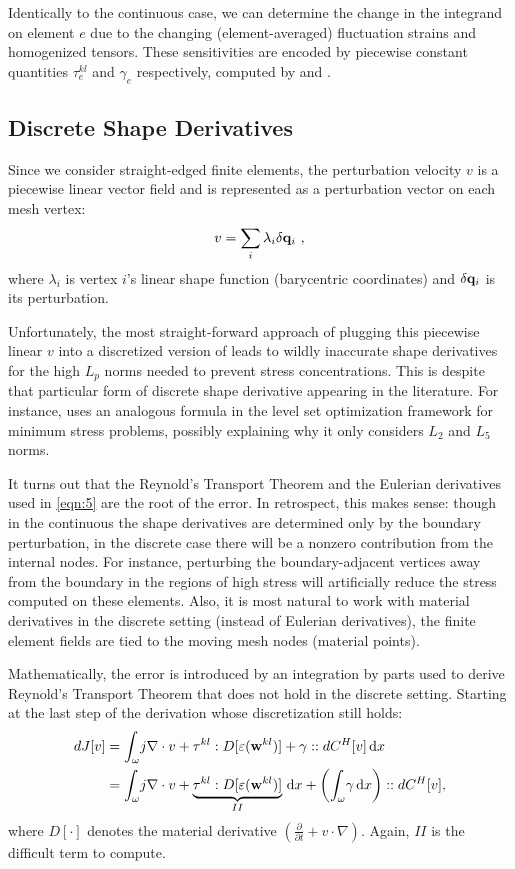 \documentclass[10pt]{article}
\renewcommand{\div}{\nabla \cdot}
\providecommand{\shape}{\omega}
\providecommand{\vint}[3][x]{\int_{#2} \! #3 \, \mathrm{d}#1}
\providecommand{\pder}[2]{\frac{\partial #1}{\partial #2}}
\renewcommand{\vec}[1]{{\bf #1}}
\newcommand\pr[1]{\prettyref{#1}}
\def\w{\vec{w}}
\def\q{\vec{q}}
\def\strain{\varepsilon}
\begin{document}
Identically to the continuous case, we can determine the change in the
integrand on element $e$ due to the changing (element-averaged) fluctuation
strains and homogenized tensors. These sensitivities are encoded by piecewise
constant quantities $\tau^{kl}_e$ and $\gamma_e$ respectively, computed by
\pr{eqn:tau} and \pr{eqn:gamma}.

\subsection{Discrete Shape Derivatives}
Since we consider straight-edged finite elements, the perturbation velocity
$v$ is a piecewise linear vector field and is represented as a perturbation
vector on each mesh vertex:
$$
v = \sum_{i} \lambda_i \delta \q_i\ ,
$$
where $\lambda_i$ is vertex $i$'s linear shape function (barycentric
coordinates) and $\delta \q_i$ is its perturbation.

Unfortunately, the most straight-forward approach of plugging this piecewise
linear $v$ into a discretized version of \pr{eqn:cts_shape_der} leads to wildly
inaccurate shape derivatives for the high $L_p$ norms needed to prevent stress
concentrations. This is despite that particular form of discrete shape derivative
appearing in the literature. For instance, \cite{Allaire2008909} uses an analogous
formula in the level set optimization framework for minimum stress problems,
possibly explaining why it only considers $L_2$ and $L_5$ norms.

It turns out that the Reynold's Transport Theorem and the Eulerian derivatives
used in \ref{eqn:5} are the root of the error. In retrospect, this makes
sense: though in the continuous the shape derivatives are determined only by
the boundary perturbation, in the discrete case there will be a nonzero
contribution from the internal nodes. For instance, perturbing the
boundary-adjacent vertices away from the boundary in the regions of high stress
will artificially reduce the stress computed on these elements. Also, it is
most natural to work with material derivatives in the discrete setting (instead
of Eulerian derivatives), the finite element fields are tied to the moving mesh
nodes (material points).

Mathematically, the error is introduced by an integration by parts used to
derive Reynold's Transport Theorem that does not hold in the discrete setting.
Starting at the last step of the derivation whose discretization still holds:
\begin{align}
\notag
dJ[v]
&= \vint{\shape}{j \div v + \tau^{kl} : D[\strain(\w^{kl})] + \gamma :: dC^H[v]} \\
&= \vint{\shape}{j \div v + \underbrace{\tau^{kl} : D[\strain(\w^{kl})]}_{II}} + \left(\vint{\shape}{\gamma}\right) :: dC^H[v],
\label{eqn:discretizable_dJ}
\end{align}
where $D[\cdot]$ denotes the material derivative $\left(\pder{}{t} + v \cdot
\nabla\right)$. Again, $II$ is the difficult term to compute.
\end{document}
